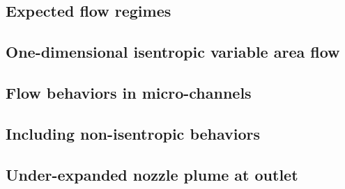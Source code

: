 \subsection{Expected flow regimes}\label{sec:expected-flow-regimes}
	
	\newpage

\subsection{One-dimensional isentropic variable area flow}\label{sec:one-dim-isentropic}
	
	\newpage

\subsection{Flow behaviors in micro-channels}\label{sec:micro-channels}
	
	\newpage

\subsection{Including non-isentropic behaviors}\label{sec:disconnected-reservoirs}
	
	\newpage

\subsection{Under-expanded nozzle plume at outlet}\label{sec:outlet_plume}
	
	\newpage
